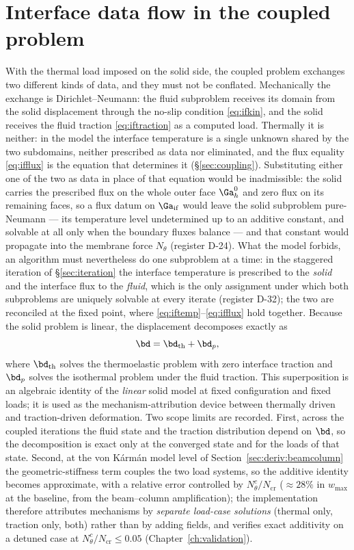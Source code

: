 \section{Interface data flow in the coupled problem}
\label{sec:datamodel}
With the thermal load imposed on the solid side, the coupled problem exchanges two different kinds
of data, and they must not be conflated. Mechanically the exchange is Dirichlet--Neumann: the fluid
subproblem receives its domain from the solid displacement through the no-slip condition
\eqref{eq:ifkin}, and the solid receives the fluid traction \eqref{eq:iftraction} as a computed load.
Thermally it is neither: in the model the interface temperature is a single unknown shared by the
two subdomains, neither prescribed as data nor eliminated, and the flux equality
\eqref{eq:ifflux} is the equation that determines it (\S\ref{sec:coupling}). Substituting either
one of the two as data in place of that equation would be inadmissible: the solid carries the
prescribed flux on the whole outer face $\Ga_h^0$ and zero flux on its remaining faces, so a flux
datum on $\Ga_{\mathrm{if}}$ would leave the solid subproblem pure-Neumann --- its temperature level
undetermined up to an additive constant, and solvable at all only when the boundary fluxes balance
--- and that constant would propagate into the membrane force $N_\theta$ (register D-24). What the
model forbids, an algorithm must nevertheless do one subproblem at a time: in the staggered
iteration of \S\ref{sec:iteration} the interface temperature is prescribed to the \emph{solid} and
the interface flux to the \emph{fluid}, which is the only assignment under which both subproblems
are uniquely solvable at every iterate (register D-32); the two are reconciled at the fixed point,
where \eqref{eq:iftemp}--\eqref{eq:ifflux} hold together. Because the
solid problem is linear, the displacement decomposes exactly as
\begin{equation}
\bd=\bd_{\mathrm{th}}+\bd_p,
\label{eq:superposition}
\end{equation}
where $\bd_{\mathrm{th}}$ solves the thermoelastic problem with zero interface traction and
$\bd_p$ solves the isothermal problem under the fluid traction. This superposition is an algebraic
identity of the \emph{linear} solid model at fixed configuration and fixed loads; it is used as
the mechanism-attribution device between thermally driven and traction-driven deformation. Two
scope limits are recorded. First, across the coupled iterations the fluid state and the traction
distribution depend on $\bd$, so the decomposition is exact only at the converged state and for
the loads of that state. Second, at the von K\'arm\'an model level of
Section~\ref{sec:deriv:beamcolumn} the geometric-stiffness term couples the two load systems, so
the additive identity becomes approximate, with a relative error controlled by
$N_\theta^c/N_{\mathrm{cr}}$ ($\approx28\%$ in $w_{\max}$ at the baseline, from the
beam--column amplification); the implementation therefore attributes mechanisms by
\emph{separate load-case solutions} (thermal only, traction only, both) rather than by adding
fields, and verifies exact additivity on a detuned case at $N_\theta^c/N_{\mathrm{cr}}\le0.05$
(Chapter~\ref{ch:validation}).
